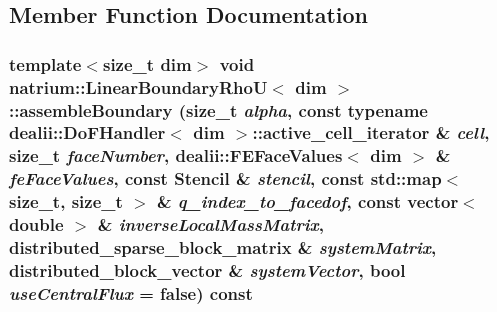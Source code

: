 \subsection{Member Function Documentation}
\hypertarget{classnatrium_1_1LinearBoundaryRhoU_a5e8291245a4d0a81ed8a7545e0ffbe96}{
\subsubsection[{assembleBoundary}]{\setlength{\rightskip}{0pt plus 5cm}template$<$size\_\-t dim$>$ void {\bf natrium::LinearBoundaryRhoU}$<$ dim $>$::assembleBoundary (size\_\-t {\em alpha}, \/  const typename dealii::DoFHandler$<$ dim $>$::active\_\-cell\_\-iterator \& {\em cell}, \/  size\_\-t {\em faceNumber}, \/  dealii::FEFaceValues$<$ dim $>$ \& {\em feFaceValues}, \/  const {\bf Stencil} \& {\em stencil}, \/  const std::map$<$ size\_\-t, size\_\-t $>$ \& {\em q\_\-index\_\-to\_\-facedof}, \/  const vector$<$ double $>$ \& {\em inverseLocalMassMatrix}, \/  distributed\_\-sparse\_\-block\_\-matrix \& {\em systemMatrix}, \/  distributed\_\-block\_\-vector \& {\em systemVector}, \/  bool {\em useCentralFlux} = {\ttfamily false}) const}}
\label{classnatrium_1_1LinearBoundaryRhoU_a5e8291245a4d0a81ed8a7545e0ffbe96}


